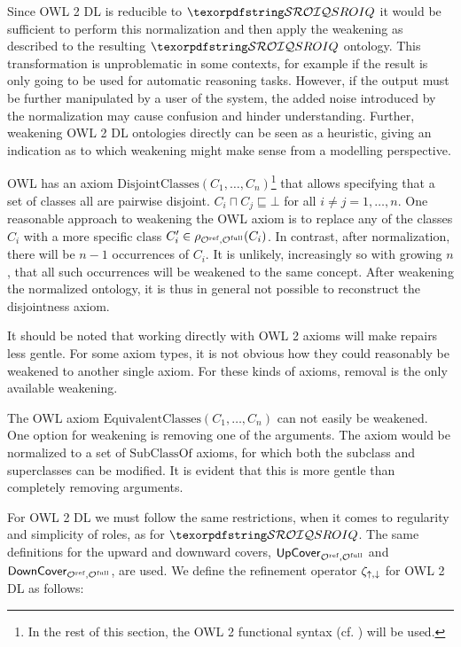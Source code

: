 Since OWL 2 DL is reducible to $\SROIQ$ it would be sufficient to perform this normalization and then apply the weakening as described to the resulting $\SROIQ$ ontology. This transformation is unproblematic in some contexts, for example if the result is only going to be used for automatic reasoning tasks. However, if the output must be further manipulated by a user of the system, the added noise introduced by the normalization may cause confusion and hinder understanding. Further, weakening OWL 2 DL ontologies directly can be seen as a heuristic, giving an indication as to which weakening might make sense from a modelling perspective.

\begin{example}
  OWL has an axiom $\mathrm{DisjointClasses}(C_1, \dots, C_n)$\footnote{In the rest of this section, the OWL 2 functional syntax (cf. \cite{motik2012ontology}) will be used.} that allows specifying that a set of classes all are pairwise disjoint. $C_i \sqcap C_j \sqsubseteq \bot$ for all $i \not= j = 1, \dots, n$. One reasonable approach to weakening the OWL axiom is to replace any of the classes $C_i$ with a more specific class $C_i' \in \rho_{{\mathcal{O}^\textnormal{ref}},{\mathcal{O}^\textnormal{full}}}(C_i)$. In contrast, after normalization, there will be $n - 1$ occurrences of $C_i$. It is unlikely, increasingly so with growing $n$, that all such occurrences will be weakened to the same concept. After weakening the normalized ontology, it is thus in general not possible to reconstruct the disjointness axiom.
\end{example}

It should be noted that working directly with OWL 2 axioms will make repairs less gentle. For some axiom types, it is not obvious how they could reasonably be weakened to another single axiom. For these kinds of axioms, removal is the only available weakening.

\begin{example}
  The OWL axiom $\mathrm{EquivalentClasses}(C_1, \dots, C_n)$ can not easily be weakened. One option for weakening is removing one of the arguments. The axiom would be normalized to a set of $\mathrm{SubClassOf}$ axioms, for which both the subclass and superclasses can be modified. It is evident that this is more gentle than completely removing arguments.
\end{example}

For OWL 2 DL we must follow the same restrictions, when it comes to regularity and simplicity of roles, as for $\SROIQ$. The same definitions for the upward and downward covers, ${\mathsf{UpCover}}_{{\mathcal{O}^\textnormal{ref}},{\mathcal{O}^\textnormal{full}}}$ and ${\mathsf{DownCover}}_{{\mathcal{O}^\textnormal{ref}},{\mathcal{O}^\textnormal{full}}}$, are used. We define the refinement operator $\zeta_{\mathop{\uparrow},\mathop{\downarrow}}$ for OWL 2 DL as follows:


